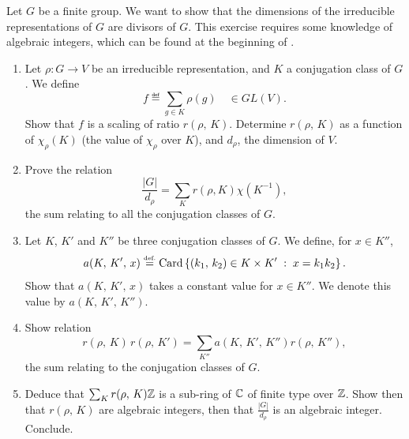  
\begin{exo}
\label{exo-representation-theory-numbers}
 
Let $G$ be a finite group. We want to show that the dimensions of the irreducible representations of $G$ are divisors of $G$. This exercise requires some knowledge of algebraic integers, which can be found at the beginning of . \begin{enumerate}
\item Let $ \rho: G \rightarrow V $ be an irreducible representation, and $K$ a conjugation class of $G$. We define
\begin{equation*}
f \eqdef \sum_{g \in K}{\rho (g)} \quad \in GL (V).
\end{equation*}
Show that $ f $ is a scaling of ratio $ r (\rho, \, K) $. Determine $ r (\rho, \, K) $ as a function of $ \chi_\rho (K) $ (the value of $ \chi_\rho $ over $K$), and $ d_\rho $, the dimension of $V$.
\item Prove the relation
\begin{equation*}
\frac{|G|}{d_\rho} = \sum_{K}{r (\rho, K) \chi (K^{-1})},
\end{equation*}
the sum relating to all the conjugation classes of $G$.
\item Let $K$, $ K'$ and $ K''$ be three conjugation classes of $G$. We define, for $ x \in K'' $,
\begin{equation*}
a (K, \, K', \, x) \stackrel{\mbox{\upshape\tiny def.}}{=} \operatorname{Card} \left\{ (k_1, \, k_2) \in K \times K' \;:\; x = k_1 k_2 \right\}.
\end{equation*}
Show that $ a (K, \, K', \, x) $ takes a constant value for $ x \in K''$. We denote this value by $ a (K, \, K', \, K'') $.
\item Show relation
\begin{equation*}
r (\rho, \, K) \, r (\rho, \, K') = \sum_{K''}{a (K, \, K', \, K'') r (\rho, \, K'')},
\end{equation*}
the sum relating to the conjugation classes of $G$.
\item Deduce that $ \sum_{K}{r (\rho, \, K) \mathbb{Z}} $ is a sub-ring of $ \mathbb{C} $ of finite type over $ \mathbb{Z} $. Show then that $ r (\rho, \, K) $ are algebraic integers, then that $ \frac{|G|}{d_\rho} $ is an algebraic integer. Conclude.
\end{enumerate}
\end{exo}
 

